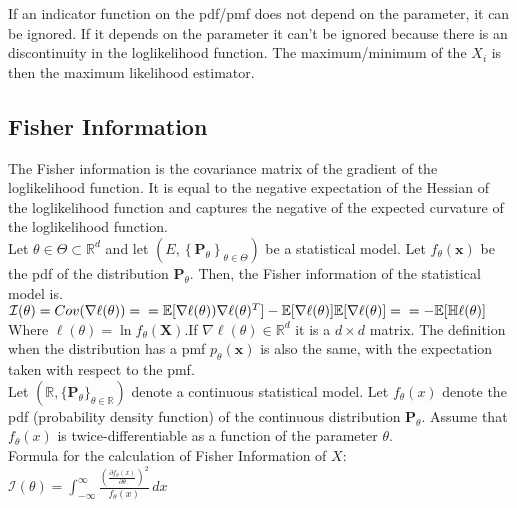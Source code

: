 If an indicator function on the pdf/pmf does not depend on the parameter, it can be ignored. If it depends on the parameter it can't be ignored because there is an discontinuity in the loglikelihood function. The maximum/minimum of the $X_i$ is then the maximum likelihood estimator.

\subsection{Fisher Information}

The Fisher information is the covariance matrix of the gradient of the loglikelihood function. It is equal to the negative expectation of the Hessian of the loglikelihood function and captures the negative of the expected curvature of the loglikelihood function.\\

Let $\theta \in \Theta \subset \mathbb {R}^ d$ and let $\left(E,\left\{ \mathbf{P}_\theta \right\} _{\theta \in \Theta }\right)$ be a statistical model. Let $f_{\theta }(\mathbf x)$ be the pdf of the distribution $\mathbf{P}_\theta$. Then, the Fisher information of the statistical model is.\\

$\mathcal{I}(\theta) = Cov(\nabla \ell(\theta)) = \\ = \mathbb{E}[\nabla \ell(\theta))\nabla\ell(\theta)^T] -  \mathbb{E}[\nabla \ell(\theta)]\mathbb{E}[\nabla \ell(\theta)] =\\ = -\mathbb{E}[\mathbb{H}\ell(\theta)]$\\

Where $\ell (\theta ) = \ln f_\theta (\mathbf X)$.If $\nabla\ell(\theta) \in \mathbb{R}^d$ it is a $d \times d$ matrix. The definition when the distribution has a pmf $p_\theta (\mathbf x)$ is also the same, with the expectation taken with respect to the pmf.\\

Let $(\mathbb {R}, \{ \mathbf{P}_\theta \} _{\theta \in \mathbb {R}})$ denote a continuous statistical model. Let $f_\theta (x)$ denote the pdf (probability density function) of the continuous distribution $\mathbf{P}_\theta$. Assume that $f_\theta (x)$ is twice-differentiable as a function of the parameter $\theta$.\\

Formula for the calculation of Fisher Information of $X$:\\

$\mathcal{I}(\theta )= \int _{-\infty }^\infty \frac{\left(\frac{\partial f_\theta (x)}{\partial \theta }\right)^2}{f_\theta (x)} \,  dx$ \\


